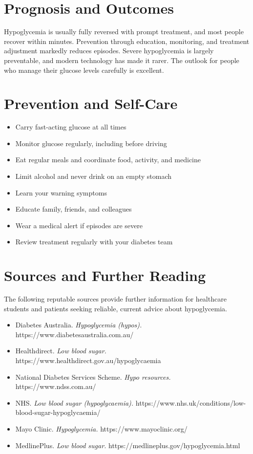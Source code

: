 \section*{Prognosis and Outcomes}
Hypoglycemia is usually fully reversed with prompt treatment, and most people recover within minutes. Prevention through education, monitoring, and treatment adjustment markedly reduces episodes. Severe hypoglycemia is largely preventable, and modern technology has made it rarer. The outlook for people who manage their glucose levels carefully is excellent.

\section*{Prevention and Self-Care}
\begin{itemize}
    \item Carry fast-acting glucose at all times
    \item Monitor glucose regularly, including before driving
    \item Eat regular meals and coordinate food, activity, and medicine
    \item Limit alcohol and never drink on an empty stomach
    \item Learn your warning symptoms
    \item Educate family, friends, and colleagues
    \item Wear a medical alert if episodes are severe
    \item Review treatment regularly with your diabetes team
\end{itemize}

\section*{Sources and Further Reading}
The following reputable sources provide further information for healthcare students and patients seeking reliable, current advice about hypoglycemia.

\begin{itemize}
    \item Diabetes Australia. \textit{Hypoglycemia (hypos).} https://www.diabetesaustralia.com.au/
    \item Healthdirect. \textit{Low blood sugar.} https://www.healthdirect.gov.au/hypoglycaemia
    \item National Diabetes Services Scheme. \textit{Hypo resources.} https://www.ndss.com.au/
    \item NHS. \textit{Low blood sugar (hypoglycaemia).} https://www.nhs.uk/conditions/low-blood-sugar-hypoglycaemia/
    \item Mayo Clinic. \textit{Hypoglycemia.} https://www.mayoclinic.org/
    \item MedlinePlus. \textit{Low blood sugar.} https://medlineplus.gov/hypoglycemia.html
\end{itemize}
